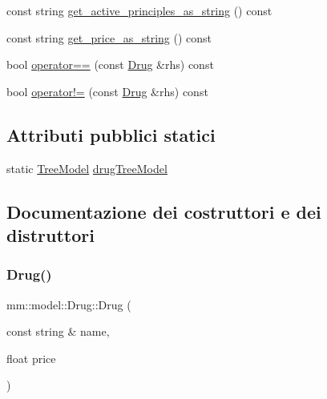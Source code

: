 \begin{DoxyCompactItemize}
const string \hyperlink{classmm_1_1model_1_1_drug_aaa9a406540607aed5845bb6af20b1231}{get\+\_\+active\+\_\+principles\+\_\+as\+\_\+string} () const
\item 
const string \hyperlink{classmm_1_1model_1_1_drug_ab5bfd8748a32b0cb366c4bf29633f00a}{get\+\_\+price\+\_\+as\+\_\+string} () const
\item 
bool \hyperlink{classmm_1_1model_1_1_drug_a15151e60eef91b544c63d8ff55db7bab}{operator==} (const \hyperlink{classmm_1_1model_1_1_drug}{Drug} \&rhs) const
\item 
bool \hyperlink{classmm_1_1model_1_1_drug_a51d9c5692835cab9d206580ccf8d0e1e}{operator!=} (const \hyperlink{classmm_1_1model_1_1_drug}{Drug} \&rhs) const
\end{DoxyCompactItemize}
\subsection*{Attributi pubblici statici}
\begin{DoxyCompactItemize}
\item 
static \hyperlink{structmm_1_1model_1_1_drug_1_1_tree_model}{Tree\+Model} \hyperlink{classmm_1_1model_1_1_drug_a9169612d0fc3b3b25063a1686be30af9}{drug\+Tree\+Model}
\end{DoxyCompactItemize}


\subsection{Documentazione dei costruttori e dei distruttori}
\mbox{\label{classmm_1_1model_1_1_drug_a23f6e0538f52bd77fb8fa511392889a6}} 
\subsubsection{\texorpdfstring{Drug()}{Drug()}\hspace{0.1cm}{\footnotesize\ttfamily [1/2]}}
{\footnotesize\ttfamily mm\+::model\+::\+Drug\+::\+Drug (\begin{DoxyParamCaption}\item[{const string \&}]{name,  }\item[{float}]{price }\end{DoxyParamCaption})}

\mbox{\label{classmm_1_1model_1_1_drug_a60cb5ecb3ed21da2f7f7e8bc94a1019d}} 
